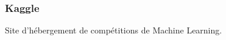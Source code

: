 \begin{frame}
  \frametitle{Kaggle}
  Site d'hébergement de compétitions de Machine Learning.
\end{frame}
